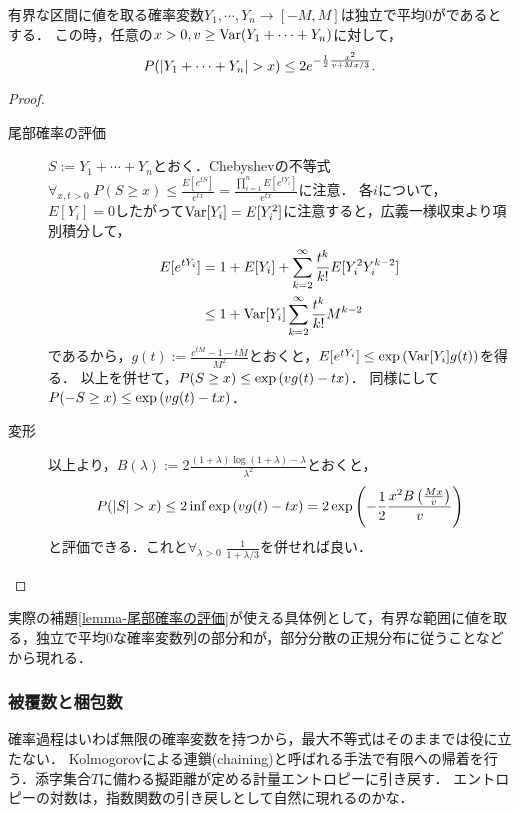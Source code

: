 \documentclass[uplatex,dvipdfmx]{jsreport}
\begin{document}
\begin{lemma}[Bernstein]\label{lemma-Bernstein}
    有界な区間に値を取る確率変数$Y_1,\cdots,Y_n\to[-M,M]$は独立で平均$0$がであるとする．
    この時，任意の$x>0,v\ge\mathrm{Var}(Y_1+\cdots+Y_n)$に対して，
    \[P(\lvert Y_1+\cdots+Y_n\rvert>x)\le 2e^{-\frac{1}{2}\frac{x^2}{v+Mx/3}}.\]
\end{lemma}
\begin{proof}\mbox{}
    \begin{description}
        \item[尾部確率の評価] 
        $S:=Y_1+\cdots+Y_n$とおく．Chebyshevの不等式$\forall_{x,t>0}\;P(S\ge x)\le\frac{E[e^{tS}]}{e^{tx}}=\frac{\prod_{i=1}^nE[e^{tY_i}]}{e^{tx}}$に注意．
        各$i$について，$E[Y_i]=0$したがって$\mathrm{Var}[Y_i]=E[Y_i^2]$に注意すると，広義一様収束より項別積分して，
        \begin{align*}
            E[e^{tY_i}]&=1+E[Y_i]+\sum^\infty_{k=2}\frac{t^k}{k!}E[Y^2_iY^{k-2}_i]\\
            &\le 1+\mathrm{Var}[Y_i]\sum^\infty_{k=2}\frac{t^k}{k!}M^{k-2}
        \end{align*}
        であるから，$g(t):=\frac{e^{tM}-1-tM}{M^2}$とおくと，$E[e^{tY_i}]\le\exp\left(\mathrm{Var}[Y_i]g(t)\right)$を得る．
        以上を併せて，$P(S\ge x)\le\exp\left(vg(t)-tx\right)$．
        同様にして$P(-S\ge x)\le\exp\left(vg(t)-tx\right)$．
        \item[変形]
        以上より，$B(\lambda):=2\frac{(1+\lambda)\log(1+\lambda)-\lambda}{\lambda^2}$とおくと，
        \[P(\lvert S\rvert>x)\le 2\inf\exp\left(vg(t)-tx\right)=2\exp\left(-\frac{1}{2}\frac{x^2B\left(\frac{Mx}{v}\right)}{v}\right)\]
        と評価できる．これと$\forall_{\lambda>0}\;\frac{1}{1+\lambda/3}$を併せれば良い．
    \end{description}
\end{proof}
\begin{remarks}
    実際の補題\ref{lemma-尾部確率の評価}が使える具体例として，有界な範囲に値を取る，独立で平均$0$な確率変数列の部分和が，部分分散の正規分布に従うことなどから現れる．
\end{remarks}

\subsubsection{被覆数と梱包数}

\begin{tcolorbox}[colframe=ForestGreen, colback=ForestGreen!10!white,breakable,colbacktitle=ForestGreen!40!white,coltitle=black,fonttitle=\bfseries\sffamily,
title=一般最大不等式の導出]
    確率過程はいわば無限の確率変数を持つから，最大不等式はそのままでは役に立たない．
    Kolmogorovによる連鎖(chaining)と呼ばれる手法で有限への帰着を行う．添字集合$T$に備わる擬距離が定める計量エントロピーに引き戻す．
    エントロピーの対数は，指数関数の引き戻しとして自然に現れるのかな．
\end{tcolorbox}
\end{document}
